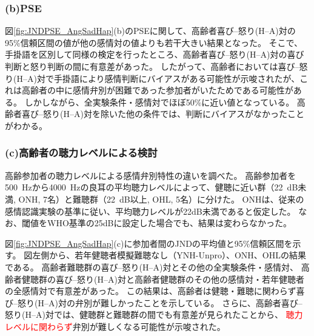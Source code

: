 \subsubsection{(b)PSE}
図\ref{fig:JNDPSE_AngSadHap}(b)のPSEに関して、高齢者喜び--怒り(H--A)対の95\%信頼区間の値が他の感情対の値よりも若干大きい結果となった。
そこで、手掛語を区別して同様の検定を行ったところ、高齢者喜び--怒り(H--A)対の喜び判断と怒り判断の間に有意差があった。
したがって、高齢者においては喜び--怒り(H--A)対で手掛語により感情判断にバイアスがある可能性が示唆されたが、これは高齢者の中に感情弁別が困難であった参加者がいたためである可能性がある。
しかしながら、全実験条件・感情対でほぼ50\%に近い値となっている。
高齢者喜び--怒り(H--A)対を除いた他の条件では、判断にバイアスがなかったことがわかる。

\subsubsection{(c)高齢者の聴力レベルによる検討}
高齢参加者の聴力レベルによる感情弁別特性の違いを調べた。
高齢参加者を500~Hzから4000~Hzの良耳の平均聴力レベルによって、健聴に近い群（22~dB未満, ONH, 7名）と難聴群（22~dB以上, OHL, 5名）に分けた。
ONHは、従来の感情認識実験\cite{christensen2019effects}の基準に従い、平均聴力レベルが22dB未満であると仮定した。
なお、閾値をWHO基準の25dBに設定した場合でも、結果は変わらなかった。

図\ref{fig:JNDPSE_AngSadHap}(c)に参加者間のJNDの平均値と95\%信頼区間を示す。
図左側から、若年健聴者模擬難聴なし（YNH-Unpro）、ONH、OHLの結果である。
高齢者難聴群の喜び--怒り(H--A)対とその他の全実験条件・感情対、
高齢者健聴群の喜び--怒り(H--A)対と高齢者健聴群のその他の感情対・若年健聴者の全感情対で有意差があった。
この結果は、高齢者は健聴・難聴に関わらず喜び--怒り(H--A)対の弁別が難しかったことを示している。
さらに、高齢者喜び--怒り(H--A)対では、健聴群と難聴群の間でも有意差が見られたことから、
\textcolor{red}{聴力レベルに関わらず}弁別が難しくなる可能性が示唆された。





